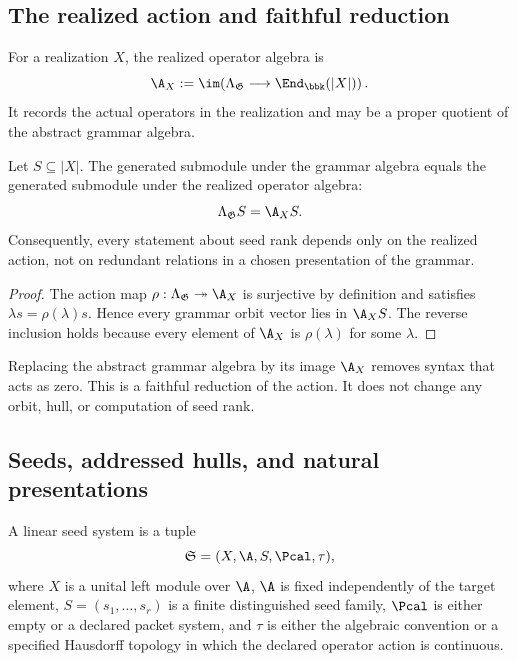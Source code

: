 \subsection{The realized action and faithful reduction}
\begin{definition}
\label{def:realized-algebra}
For a realization $X$, the realized operator algebra is
\[
\A_X:=\im\!\left(\Lambda_{\mathfrak G}\longrightarrow\End_{\bbk}(|X|)\right).
\]
It records the actual operators in the realization and may be a proper quotient of the abstract grammar algebra.
\end{definition}

\begin{proposition}
\label{prop:action-factorization}
Let $S\subseteq |X|$.  The generated submodule under the grammar algebra equals the generated submodule under the realized operator algebra:
\[
\Lambda_{\mathfrak G}S=\A_XS.
\]
Consequently, every statement about seed rank depends only on the realized action, not on redundant relations in a chosen presentation of the grammar.
\end{proposition}

\begin{proof}
The action map $\rho:\Lambda_{\mathfrak G}\twoheadrightarrow\A_X$ is surjective by definition and satisfies $\lambda s=\rho(\lambda)s$.  Hence every grammar orbit vector lies in $\A_XS$.  The reverse inclusion holds because every element of $\A_X$ is $\rho(\lambda)$ for some $\lambda$.
\end{proof}

\begin{keyidea}
Replacing the abstract grammar algebra by its image \(\A_X\) removes syntax that acts as zero.  This is a faithful reduction of the action.  It does not change any orbit, hull, or computation of seed rank.
\end{keyidea}


\subsection{Seeds, addressed hulls, and natural presentations}
\begin{definition}
\label{def:seed-system}
A linear seed system is a tuple
\[
\mathfrak S=(X,\A,S,\Pcal,\tau),
\]
where $X$ is a unital left module over $\A$, $\A$ is fixed independently of the target element, $S=(s_1,\ldots,s_r)$ is a finite distinguished seed family, $\Pcal$ is either empty or a declared packet system, and $\tau$ is either the algebraic convention or a specified Hausdorff topology in which the declared operator action is continuous.
\end{definition}

